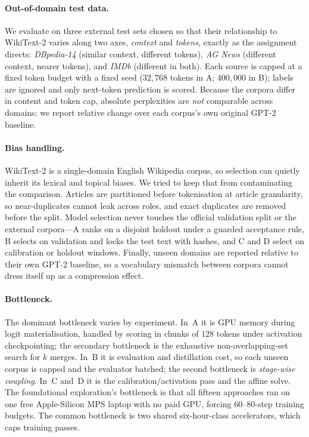 \documentclass[10pt,a4paper]{article}
\begin{document}
\paragraph{Out-of-domain test data.} We evaluate on three external test sets
chosen so that their relationship to WikiText-2 varies along two axes,
\emph{context} and \emph{tokens}, exactly as the assignment directs:
\emph{DBpedia-14} \citep{zhang2015character,lehmann2015dbpedia} (similar
context, different tokens), \emph{AG News} \citep{zhang2015character} (different
context, nearer tokens), and \emph{IMDb} \citep{maas2011learning} (different in
both). Each source is capped at a fixed token budget with a fixed seed
($32{,}768$ tokens in A; $400{,}000$ in B); labels are ignored and only
next-token prediction is scored. Because the corpora differ in content and token
cap, absolute perplexities are \emph{not} comparable across domains; we report
relative change over each corpus's own original GPT-2 baseline.

\paragraph{Bias handling.} WikiText-2 is a single-domain English Wikipedia
corpus, so selection can quietly inherit its lexical and topical biases. We
tried to keep that from contaminating the comparison. Articles are partitioned
before tokenisation at article granularity, so near-duplicates cannot leak
across roles, and exact duplicates are removed before the split. Model
selection never touches the official validation split or the external
corpora---A ranks on a disjoint holdout under a guarded acceptance rule, B
selects on validation and locks the test text with hashes, and C and D select
on calibration or holdout windows. Finally, unseen domains are reported
relative to their own GPT-2 baseline, so a vocabulary mismatch between corpora
cannot dress itself up as a compression effect.

\paragraph{Bottleneck.} The dominant bottleneck varies by experiment. In~A it is
GPU memory during logit materialisation, handled by scoring in chunks of $128$
tokens under activation checkpointing; the secondary bottleneck is the
exhaustive non-overlapping-set search for $k$ merges. In~B it is evaluation and
distillation cost, so each unseen corpus is capped and the evaluator batched; the
second bottleneck is \emph{stage-wise coupling}. In~C and~D it is the
calibration/activation pass and the affine solve. The foundational exploration's
bottleneck is that all fifteen approaches ran on one free Apple-Silicon MPS
laptop with no paid GPU, forcing $60$--$80$-step training budgets. The common
bottleneck is two shared six-hour-class accelerators, which caps training
passes.
\end{document}
